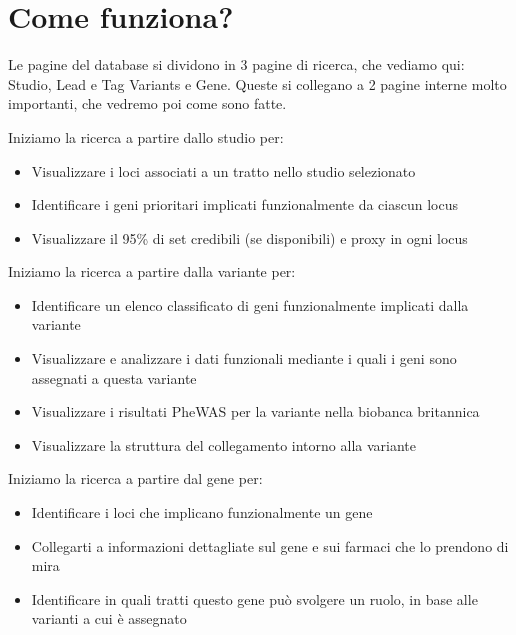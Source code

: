 \documentclass{article}
\begin{document}
\section*{Come funziona?}
Le pagine del database si dividono in 3 pagine di ricerca, che vediamo qui: Studio, Lead e Tag Variants e Gene. Queste si collegano a 2 pagine interne molto importanti, che vedremo poi come sono fatte.
\normalsize
\begin{box4}
    [title={\textbf{Ricerca per Studio}}]
    {Iniziamo la ricerca a partire dallo studio per:
    \begin{itemize}
        \item Visualizzare i loci associati a un tratto nello studio selezionato
        \item Identificare i geni prioritari implicati funzionalmente da ciascun locus
        \item Visualizzare il 95\% di set credibili (se disponibili) e proxy in ogni locus
    \end{itemize}}
\end{box4}
\begin{box4}
    [title={\textbf{Ricerca per Variante}}]
    {Iniziamo la ricerca a partire dalla variante per:
    \begin{itemize}
        \item Identificare un elenco classificato di geni funzionalmente implicati dalla variante
        \item Visualizzare e analizzare i dati funzionali mediante i quali i geni sono assegnati a questa variante
        \item Visualizzare i risultati PheWAS per la variante nella biobanca britannica
        \item Visualizzare la struttura del collegamento intorno alla variante
    \end{itemize}}
\end{box4}
\begin{box4}
    [title={\textbf{Ricerca per Gene}}]
    {Iniziamo la ricerca a partire dal gene per:
    \begin{itemize}
        \item Identificare i loci che implicano funzionalmente un gene
        \item Collegarti a informazioni dettagliate sul gene e sui farmaci che lo prendono di mira
        \item Identificare in quali tratti questo gene può svolgere un ruolo, in base alle varianti a cui è assegnato
    \end{itemize}}
\end{box4}
\end{document}
